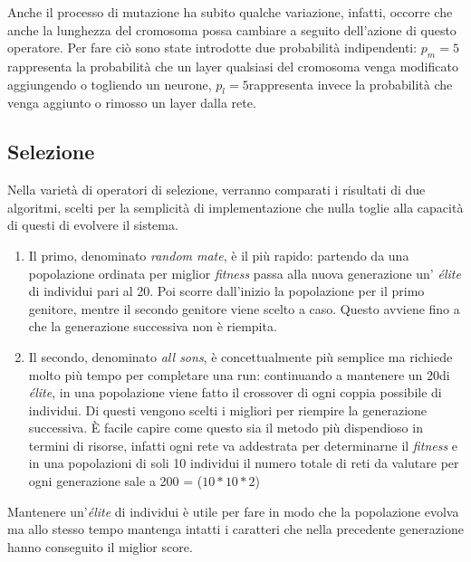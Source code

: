 \documentclass[12pt,a4paper]{report}
\begin{document}
Anche il processo di mutazione ha subito qualche variazione, infatti, occorre che anche la lunghezza del cromosoma possa cambiare a seguito dell'azione di questo operatore.
Per fare ciò sono state introdotte due probabilità indipendenti: $p_{m} = 5$\textdiscount \text{ }rappresenta la probabilità che un layer qualsiasi del cromosoma venga modificato aggiungendo o togliendo un neurone, $p_{l} = 5$\textdiscount \text{ }rappresenta invece la probabilità che venga aggiunto o rimosso un layer dalla rete.

\subsection{Selezione}

Nella varietà di operatori di selezione, verranno comparati i risultati di due algoritmi, scelti per la semplicità di implementazione che nulla toglie alla capacità di questi di evolvere il sistema.

\begin{enumerate}
 \item Il primo, denominato \textit{random mate}, è il più rapido: partendo da una popolazione ordinata per miglior \textit{fitness} passa alla nuova generazione un' \textit{élite} di individui pari al 20\textdiscount.
 Poi scorre dall'inizio la popolazione per il primo genitore, mentre il secondo genitore viene scelto a caso. 
 Questo avviene fino a che la generazione successiva non è riempita.
 
 \item Il secondo, denominato \textit{all sons}, è concettualmente più semplice ma richiede molto più tempo per completare una run: continuando a mantenere un 20\textdiscount di \textit{élite}, in una popolazione viene fatto il crossover di ogni coppia possibile di individui.
 Di questi vengono scelti i migliori per riempire la generazione successiva.
 È facile capire come questo sia il metodo più dispendioso in termini di risorse, infatti ogni rete va addestrata per determinarne il \textit{fitness} e in una popolazioni di soli 10 individui il numero totale di reti da valutare per ogni generazione sale a 200 =  ($10*10*2$)
 
\end{enumerate}

Mantenere un'\textit{élite} di individui è utile per fare in modo che la popolazione evolva ma allo stesso tempo mantenga intatti i caratteri che nella precedente generazione hanno conseguito il miglior score.
\end{document}
